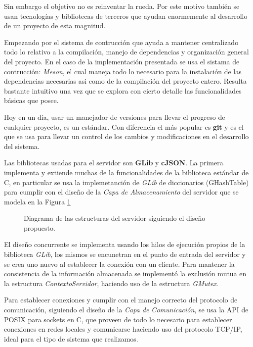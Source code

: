 \documentclass{replab}
\begin{document}
    Sin embargo el objetivo no es reinventar la rueda. Por este motivo
    también se usan tecnologías y bibliotecas de terceros que ayudan
    enormemente al desarrollo de un proyecto de esta magnitud.

    Empezando por el sistema de contrucción que ayuda a mantener
    centralizado todo lo relativo a la compilación, manejo de
    dependencias y organización general del proyecto. En el caso de la
    implementación presentada se usa el sistama de contrucción:
    \textit{Meson}, el cual maneja todo lo necesario para la
    instalación de las dependencias necesarias asi como de la
    compilación del proyecto entero. Resulta bastante intuitivo una
    vez que se explora con cierto detalle las funcionalidades básicas
    que posee.

    Hoy en un día, usar un manejador de versiones para llevar el
    progreso de cualquier proyecto, es un estándar. Con diferencia el
    más popular es \textbf{git} y es el que se usa para llevar un
    control de los cambios y modificaciones en el desarrollo del
    sistema.

    Las bibliotecas usadas para el servidor son \textbf{GLib} y
    \textbf{cJSON}. La primera implementa y extiende muchas de la
    funcionalidades de la biblioteca estándar de C, en particular se
    usa la implemetanción de \textit{GLib} de diccionarios
    (GHashTable) para cumplir con el diseño de la \textit{Capa de
      Almacenamiento} del servidor que se modela en la Figura
    \ref{fig:estruct_serv}

    \begin{figure}[htbp]
		\centering
        
		\caption{Diagrama de las estructuras del servidor siguiendo el diseño propuesto.}
		\label{fig:estruct_serv}
	\end{figure}

    El diseño concurrente se implementa usando los hilos de ejecución
    propios de la biblioteca \textit{GLib}, los mismos se encunetran
    en el punto de entrada del servidor y se crea uno nuevo al
    establecer la conexión con un cliente. Para mantener la consistencia de
    la información almacenada se implementó la exclusión mutua en la
    estructura \textit{ContextoServidor}, haciendo uso de la
    estructura \textit{GMutex}.

    Para establecer conexiones y cumplir con el manejo correcto del
    protocolo de comunicación, siguiendo el diseño de la \textit{Capa
      de Comunicación}, se usa la API de POSIX para sockets en C, que
    proveen de todo lo necesario para establecer conexiones en redes
    locales y comunicarse haciendo uso del protocolo TCP/IP, ideal
    para el tipo de sistema que realizamos.
\end{document}
